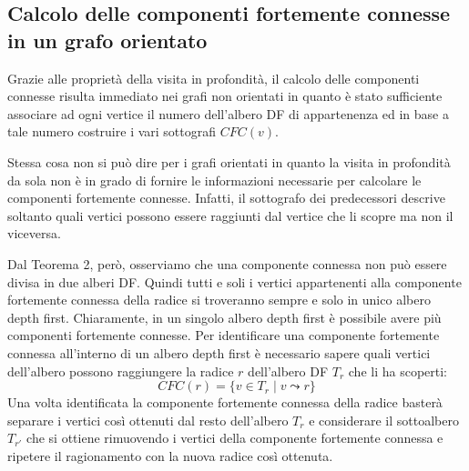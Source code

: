 \subsection{Calcolo delle componenti fortemente connesse in un grafo orientato}
Grazie alle proprietà della visita in profondità, il calcolo delle componenti connesse risulta immediato nei grafi non orientati in quanto è stato sufficiente associare ad ogni vertice il numero dell'albero DF di appartenenza ed in base a tale numero costruire i vari sottografi $CFC(v)$.

Stessa cosa non si può dire per i grafi orientati in quanto la visita in profondità da sola non è in grado di fornire le informazioni necessarie per calcolare le componenti fortemente connesse. Infatti, il sottografo dei predecessori descrive soltanto quali vertici possono essere raggiunti dal vertice che li scopre ma non il viceversa.

Dal Teorema 2, però, osserviamo che una componente connessa non può essere divisa in due alberi DF. Quindi tutti e soli i vertici appartenenti alla componente fortemente connessa della radice si troveranno sempre e solo in unico albero depth first. Chiaramente, in un singolo albero depth first è possibile avere più componenti fortemente connesse. Per identificare una componente fortemente connessa all'interno di un albero depth first è necessario sapere quali vertici dell'albero possono raggiungere la radice $r$ dell'albero DF $T_{r}$ che li ha scoperti:
\begin{displaymath}
	CFC(r) = \{ v \in T_{r} \; | \; v \leadsto r \}
\end{displaymath}
Una volta identificata la componente fortemente connessa della radice basterà separare i vertici così ottenuti dal resto dell'albero $T_{r}$ e considerare il sottoalbero $T_{r'}$ che si ottiene rimuovendo i vertici della componente fortemente connessa e ripetere il ragionamento con la nuova radice così ottenuta.

